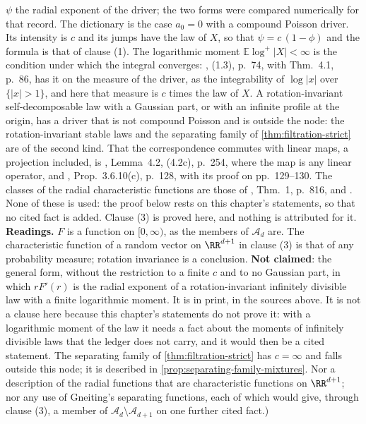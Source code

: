 \begin{proposition}
{$\psi$ the radial exponent of the driver; the two forms were compared numerically for that
record. The dictionary is the case $a_0 = 0$ with a compound Poisson driver. Its intensity is
$c$ and its jumps have the law of $X$, so that $\psi = c\,(1 - \phi)$ and the formula is that of
clause (1). The logarithmic moment $\mathbb{E}\log^+|X| < \infty$ is the condition under which
the integral converges: , (1.3), p.~74, with Thm.~4.1, p.~86, has it on
the \Levy{} measure of the driver, as the integrability of $\log|x|$ over $\{|x| > 1\}$, and
here that measure is $c$ times the law of $X$. A rotation-invariant self-decomposable law with a
Gaussian part, or with an infinite profile at the origin, has a driver that is not compound
Poisson and is outside the node: the rotation-invariant stable laws and the separating family of
\ref{thm:filtration-strict} are of the second kind. That the correspondence commutes with
linear maps, a projection included, is
, Lemma~4.2, (4.2c), p.~254, where the map is any linear operator, and
, Prop.~3.6.10(c), p.~128, with its proof on pp.~129--130. The classes
of the radial characteristic functions are those of , Thm.~1,
p.~816, and . None of these is used: the proof below rests on this
chapter's statements, so that no cited fact is added. Clause (3) is proved here, and nothing is
attributed for it. \textbf{Readings.} $F$ is a
function on $[0,\infty)$, as the members of $\mathcal{A}_d$ are. The characteristic function of a
random vector on $\RR^{d+1}$ in clause (3) is that of any probability measure; rotation
invariance is a conclusion. \textbf{Not claimed}: the general form, without the restriction to a
finite $c$ and to no Gaussian part, in which $rF'(r)$ is the radial exponent of a
rotation-invariant infinitely divisible law with a finite logarithmic moment. It is in print, in
the sources above. It is not a clause here because this chapter's statements do not prove it:
with a logarithmic moment of the law it needs a fact about the moments of infinitely divisible
laws that the ledger does not carry, and it would then be a cited statement. The separating family of
\ref{thm:filtration-strict} has $c = \infty$ and falls outside this node; it is described in
\ref{prop:separating-family-mixtures}. Nor a description of the radial functions that are
characteristic functions on $\RR^{d+1}$; nor any use of Gneiting's separating functions, each of
which would give, through clause (3), a member of $\mathcal{A}_d \setminus \mathcal{A}_{d+1}$ on
one further cited fact.)}
\end{proposition}

